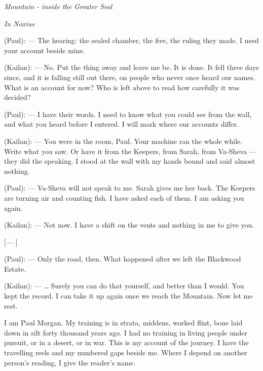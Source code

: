 
\begin{center}\small\itshape Mountain - inside the Greater Seal\end{center}

\begin{room}

\textit{In Noxius}

(Paul): --- The hearing: the sealed chamber, the five, the ruling they made. I need your account beside mine.

(Kailan): --- No. Put the thing away and leave me be. It is done. It fell three days since, and it is falling still out there, on people who never once heard our names. What is an account for now? Who is left above to read how carefully it was decided?

(Paul): --- I have their words. I need to know what you could see from the wall, and what you heard before I entered. I will mark where our accounts differ.

(Kailan): --- You were in the room, Paul. Your machine ran the whole while. Write what you saw. Or have it from the Keepers, from Sarah, from Va-Sheva --- they did the speaking. I stood at the wall with my hands bound and said almost nothing.

(Paul): --- Va-Sheva will not speak to me. Sarah gives me her back. The Keepers are turning air and counting fish. I have asked each of them. I am asking you again.

(Kailan): --- Not now. I have a shift on the vents and nothing in me to give you.

\centerline{[\,---\,]}

(Paul): --- Only the road, then. What happened after we left the Blackwood Estate.

(Kailan): --- \ldots{} Surely you can do that yourself, and better than I would. You kept the record. I can take it up again once we reach the Mountain. Now let me rest.

\end{room}

I am Paul Morgan. My training is in strata, middens, worked flint, bone laid down in silt forty thousand years ago. I had no training in living people under pursuit, or in a desert, or in war. This is my account of the journey. I have the travelling reels and my numbered gaps beside me. Where I depend on another person's reading, I give the reader's name.\par


